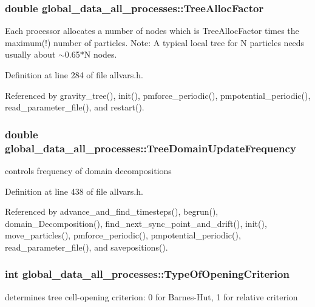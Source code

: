 \hypertarget{structglobal__data__all__processes_a374a92c40b930e388b7180b8862c3670}{
\subsubsection[{TreeAllocFactor}]{\setlength{\rightskip}{0pt plus 5cm}double {\bf global\_\-data\_\-all\_\-processes::TreeAllocFactor}}}
\label{structglobal__data__all__processes_a374a92c40b930e388b7180b8862c3670}
Each processor allocates a number of nodes which is TreeAllocFactor times the maximum(!) number of particles. Note: A typical local tree for N particles needs usually about $\sim$0.65$\ast$N nodes. 

Definition at line 284 of file allvars.h.



Referenced by gravity\_\-tree(), init(), pmforce\_\-periodic(), pmpotential\_\-periodic(), read\_\-parameter\_\-file(), and restart().

\hypertarget{structglobal__data__all__processes_a31f122fafb06e13f611ff905f514bfa9}{
\subsubsection[{TreeDomainUpdateFrequency}]{\setlength{\rightskip}{0pt plus 5cm}double {\bf global\_\-data\_\-all\_\-processes::TreeDomainUpdateFrequency}}}
\label{structglobal__data__all__processes_a31f122fafb06e13f611ff905f514bfa9}
controls frequency of domain decompositions 

Definition at line 438 of file allvars.h.



Referenced by advance\_\-and\_\-find\_\-timesteps(), begrun(), domain\_\-Decomposition(), find\_\-next\_\-sync\_\-point\_\-and\_\-drift(), init(), move\_\-particles(), pmforce\_\-periodic(), pmpotential\_\-periodic(), read\_\-parameter\_\-file(), and savepositions().

\hypertarget{structglobal__data__all__processes_a0c2a481de17eefbbd973fb8a7bb6f8fc}{
\subsubsection[{TypeOfOpeningCriterion}]{\setlength{\rightskip}{0pt plus 5cm}int {\bf global\_\-data\_\-all\_\-processes::TypeOfOpeningCriterion}}}
\label{structglobal__data__all__processes_a0c2a481de17eefbbd973fb8a7bb6f8fc}
determines tree cell-\/opening criterion: 0 for Barnes-\/Hut, 1 for relative criterion 

